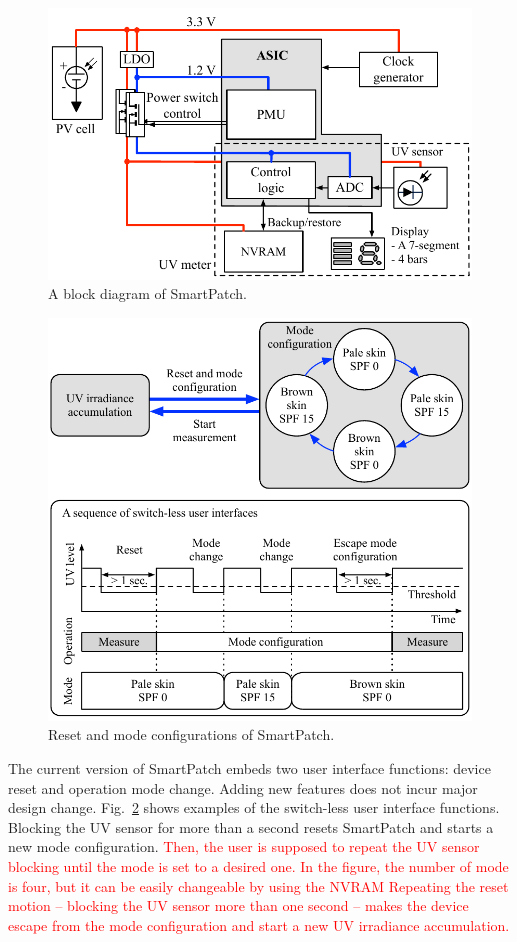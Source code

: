 \documentclass[journal]{IEEEtran}
\begin{document}
\begin{figure}
\centering
\includegraphics[width=1.0\hsize]{Figures/block_diagram.pdf}
\caption{A block diagram of SmartPatch.}
\label{fig:block_diagram}
\end{figure}

\begin{figure}
\centering
\includegraphics[width=1.0\hsize]{Figures/configuration.pdf}
\caption{Reset and mode configurations of SmartPatch.}
\label{fig:configuration}
\end{figure}

The current version of SmartPatch embeds two user interface functions: device reset and operation mode change.
Adding new features does not incur major design change.
Fig.~\ref{fig:configuration} shows examples of the switch-less user interface functions.
Blocking the UV sensor for more than a second resets SmartPatch and starts a new mode configuration.
\textcolor{red}{Then, the user is supposed to repeat the UV sensor blocking until the mode is set to a desired one. In the figure, the number of mode is four, but it can be easily changeable by using the NVRAM
Repeating the reset motion -- blocking the UV sensor more than one second -- makes the device escape from the mode configuration and start a new UV irradiance accumulation.}
\end{document}
